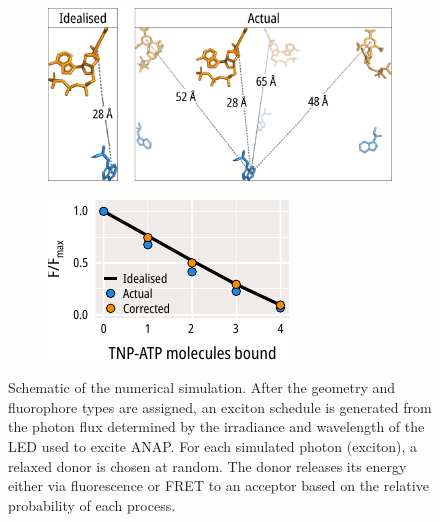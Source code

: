 \begin{figure}[h]
\begin{minipage}{0.35\textwidth}
	\end{minipage}
	\hfill
	\begin{minipage}{0.55\textwidth}
	\begin{subfigure}[t]{\textwidth}
		\caption{}\label{ch3fig:exifret_coords}
		\centering
		\includegraphics[width=\textwidth]{exifret_coords.pdf}
	\end{subfigure}
	\vfill
	\begin{subfigure}[t]{\textwidth}
		\caption{}\label{ch3fig:exifret_out}
		\centering
		\includegraphics[width=\textwidth]{exifret_out.pdf}
	\end{subfigure}
	\end{minipage}
	\caption[Numerical analysis of FRET efficiency in tetrameric Kir6.2]{
	 Schematic of the numerical simulation.
	After the geometry and fluorophore types are assigned, an exciton schedule is generated from the photon flux determined by the irradiance and wavelength of the LED used to excite ANAP.
	For each simulated photon (exciton), a relaxed donor is chosen at random.
	The donor releases its energy either via fluorescence or FRET to an acceptor based on the relative probability of each process.
}
\end{figure}

